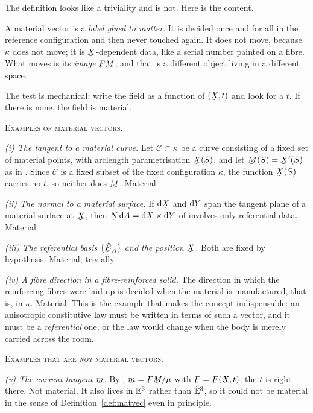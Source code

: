 \begin{remark}
\label{rem:matvec}
The definition looks like a triviality and is not. Here is the content.

A material vector is a \emph{label glued to matter}. It is decided once and
for all in the reference configuration and then never touched again. It
does not move, because $\kappa$ does not move; it is $\bX$-dependent data,
like a serial number painted on a fibre. What moves is its \emph{image}
$\bF\bM$, and that is a different object living in a different space.

The test is mechanical: write the field as a function of $(\bX,t)$ and look
for a $t$. If there is none, the field is material.

\smallskip\noindent
\textsc{Examples of material vectors.}

\smallskip\noindent
\emph{(i) The tangent to a material curve.} Let $\mathcal{C}\subset\kappa$
be a curve consisting of a fixed set of material points, with arclength
parametrisation $\bX(S)$, and let $\bM(S)=\bX'(S)$ as in . Since
$\mathcal{C}$ is a fixed subset of the fixed configuration $\kappa$, the
function $\bX(S)$ carries no $t$, so neither does $\bM$. Material.

\smallskip\noindent
\emph{(ii) The normal to a material surface.} If $\dl\bX$ and $\dl\bY$ span
the tangent plane of a material surface at $\bX$, then
$\bN\,\dl A=\dl\bX\times\dl\bY$ of  involves only referential data.
Material.

\smallskip\noindent
\emph{(iii) The referential basis $\{\hbE_{A}\}$ and the position $\bX$.}
Both are fixed by hypothesis. Material, trivially.

\smallskip\noindent
\emph{(iv) A fibre direction in a fibre-reinforced solid.} The direction in
which the reinforcing fibres were laid up is decided when the material is
manufactured, that is, in $\kappa$. Material. This is the example that
makes the concept indispensable: an anisotropic constitutive law must be
written in terms of such a vector, and it must be a \emph{referential}
one, or the law would change when the body is merely carried across the
room.

\smallskip\noindent
\textsc{Examples that are \emph{not} material vectors.}

\smallskip\noindent
\emph{(v) The current tangent $\bm$.} By , $\bm=\bF\bM/\mu$ with
$\bF=\bF(\bX,t)$; the $t$ is right there. Not material. It also lives in
$\mathbb{E}^{3}$ rather than $\hat{\mathbb{E}}^{3}$, so it could not be material in the sense of
Definition~\ref{def:matvec} even in principle.


\end{remark}
